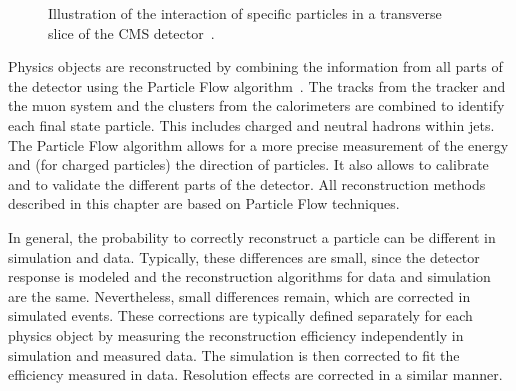 \begin{figure}[htbp!]
  \begin{center}
\caption{Illustration of the interaction of specific particles in a transverse slice of the CMS detector~\cite{Sirunyan:2017ulk}.
  \label{fig:reco_pflow}}
  \end{center}
\end{figure}

Physics objects are reconstructed by combining the information from all parts of the detector using the Particle Flow algorithm~\cite{Sirunyan:2017ulk}.
The tracks from the tracker and the muon system and the clusters from the calorimeters are combined to identify each final state particle.
This includes charged and neutral hadrons within jets. The Particle Flow algorithm allows for a more precise measurement of the energy and (for charged particles) the direction of particles.
It also allows to calibrate and to validate the different parts of the detector. All reconstruction methods described in this chapter are based on Particle Flow techniques.

In general, the probability to correctly reconstruct a particle can be different in simulation and data. Typically, these differences are small, since the detector response
is modeled and the reconstruction algorithms for data and simulation are the same. Nevertheless, small differences remain, which are corrected in simulated events.
These corrections are typically defined separately for each physics object by measuring the reconstruction efficiency independently in simulation and measured data.
The simulation is then corrected to fit the efficiency measured in data. Resolution effects are corrected in a similar manner.

